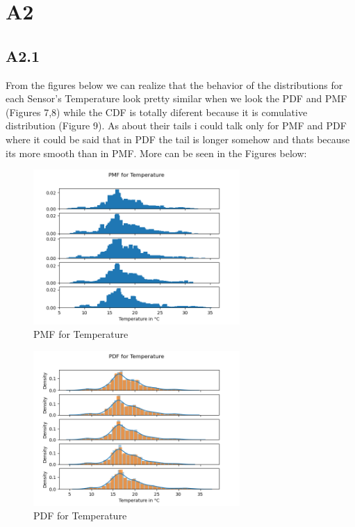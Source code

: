 \documentclass[a4paper,12pt]{article}
\begin{document}
\section{A2}
 \subsection{A2.1}
 From the figures below we can realize that the behavior of the distributions for each Sensor's Temperature look pretty similar when we look the PDF and PMF (Figures 7,8) while the CDF is totally diferent because it is comulative distribution (Figure 9). As about their tails i could talk only for PMF and PDF where it could be said that in PDF the tail is longer somehow and thats because its more smooth than in PMF. More can be seen in the Figures below:
 \samepage
  \begin{figure}[H] 
	\centering
	\includegraphics[width=0.7\textwidth]{PMF for Temperature.png}
	\caption{PMF for Temperature\cite{Maiullari2020}}
  \end{figure}
  \begin{figure}[H] 
	\centering
	\includegraphics[width=0.7\textwidth]{PDF for Temperature.png}
	\caption{PDF for Temperature\cite{Maiullari2020}}
  \end{figure}
\end{document}
